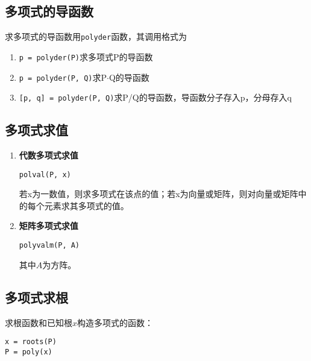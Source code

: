 \subsection{多项式的导函数}
求多项式的导函数用\lstinline|polyder|函数，其调用格式为
\begin{enumerate}[\hspace*{3em} (1)]
	\item \lstinline|p = polyder(P)|\quad 求多项式P的导函数
	\item \lstinline|p = polyder(P, Q)|\quad 求P$\cdot$Q的导函数
	\item \lstinline|[p, q] = polyder(P, Q)|\quad 求P/Q的导函数，导函数分子存入p，分母存入q
\end{enumerate}


\subsection{多项式求值}
\begin{enumerate}
	\item \textbf{代数多项式求值}
	\begin{center}
		\lstinline|polval(P, x)|
	\end{center}
	若x为一数值，则求多项式在该点的值；若x为向量或矩阵，则对向量或矩阵中的每个元素求其多项式的值。
	\item \textbf{矩阵多项式求值}
	\begin{center}
		\lstinline|polyvalm(P, A)|
	\end{center}
	其中$A$为方阵。
\end{enumerate}

\subsection{多项式求根}
求根函数和已知根$x$构造多项式的函数：
\begin{center}
	\lstinline|x = roots(P)|\\
	\lstinline|P = poly(x)|
\end{center}


